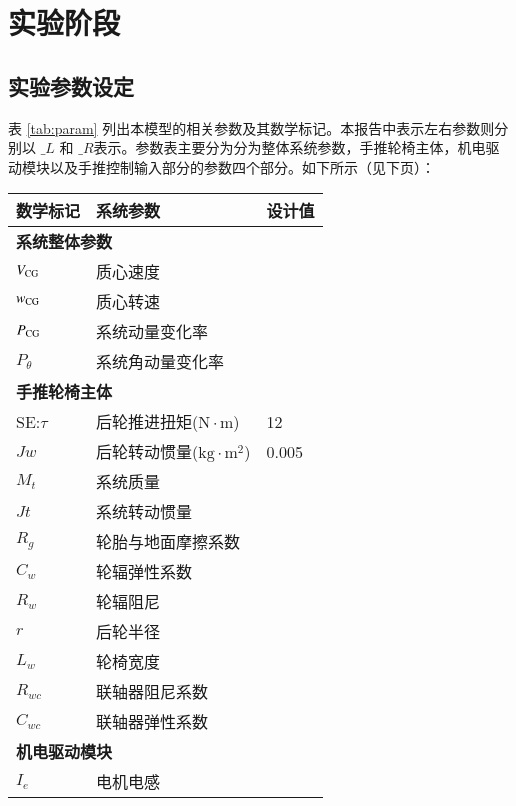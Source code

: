 \clearpage
\section{实验阶段}

\subsection{实验参数设定}

表 \ref{tab:param} 列出本模型的相关参数及其数学标记。本报告中表示左右参数则分别以 $ \_L $ 和 $ \_R $表示。参数表主要分为分为整体系统参数，手推轮椅主体，机电驱动模块以及手推控制输入部分的参数四个部分。如下所示（见下页）：

\begin{table}[H]
	\footnotesize
	\caption{系统主要参数及其数学标记}\label{tab:param}
	\begin{longtable}{l|l|l}
		\toprule
		\textbf{数学标记} & \textbf{系统参数} & \textbf{设计值}\\
		\midrule
		\endhead
		\multicolumn{3}{l}{\textbf{系统整体参数}} \\ %
		\midrule
		$ V_{\rm{CG}} $ & 质心速度 & \\
		$ w_{\rm{CG}} $ & 质心转速 & \\
		$ P_{\rm{CG}} $ & 系统动量变化率 & \\
		$ P_{\theta} $ & 系统角动量变化率 & \\
		\midrule
		\multicolumn{3}{l}{\textbf{手推轮椅主体}} \\
		\midrule
		SE:$\tau$ & 后轮推进扭矩($ \mathrm{N} \cdot \mathrm{m} $) & 12 \\
		$ J w $ & 后轮转动惯量($ \mathrm{kg} \cdot \mathrm{m}^2 $) & 0.005 \\
		$ M_t $ & 系统质量 & \\
		$ J t $ & 系统转动惯量 & \\
		$ R_g $ & 轮胎与地面摩擦系数 & \\
		$ C_w $ & 轮辐弹性系数 & \\
		$ R_w $ & 轮辐阻尼 & \\
		$ r $ & 后轮半径 & \\
		$ L_w $ & 轮椅宽度 & \\
		$ R_{wc} $ & 联轴器阻尼系数 & \\
		$ C_{wc} $ & 联轴器弹性系数 & \\
		\midrule
		\multicolumn{3}{l}{\textbf{机电驱动模块}} \\
		\midrule
		$ I_e $ & 电机电感 & \\

\end{longtable}
\end{table}
